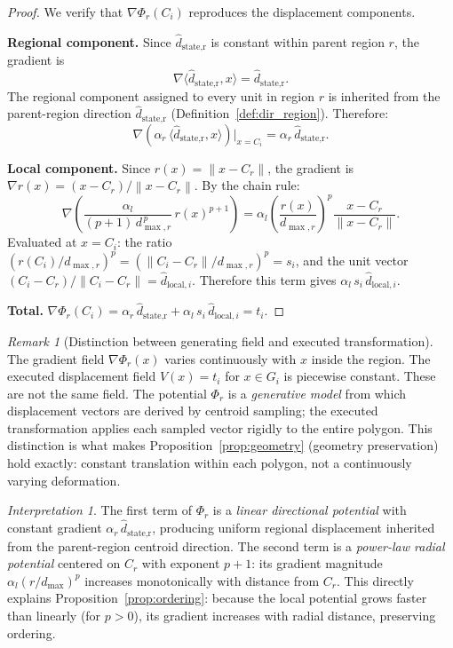 \documentclass[12pt, a4paper]{article}
\numberwithin{equation}{section}
\theoremstyle{definition}
\theoremstyle{plain}
\theoremstyle{remark}
\newtheorem*{remark}{Remark}
\newtheorem*{interpretation}{Interpretation}
\newcommand{\norm}[1]{\left\|#1\right\|}
\newcommand{\dhat}[1]{\hat{d}_{\text{#1}}}
\newcommand{\dhati}[1]{\hat{d}_{\text{#1},i}}
\newcommand{\inner}[2]{\langle #1, #2 \rangle}
\begin{document}
\begin{proof}
We verify that $\nabla\Phi_r(C_i)$ reproduces the displacement components.

\medskip\noindent\textbf{Regional component.}
Since $\dhat{state,r}$ is constant within parent region $r$, the gradient is
\[
  \nabla \inner{\dhat{state,r}}{x} = \dhat{state,r}.
\]
The regional component assigned to every unit in region $r$ is inherited from the parent-region direction $\dhat{state,r}$ (Definition~\ref{def:dir_region}). Therefore:
\[
  \nabla\!\left(\alpha_r\,\inner{\dhat{state,r}}{x}\right)\big|_{x = C_i} = \alpha_r\,\dhat{state,r}.
\]

\medskip\noindent\textbf{Local component.}
Since $r(x) = \norm{x - C_r}$, the gradient is $\nabla r(x) = (x - C_r)/\norm{x - C_r}$. By the chain rule:
\[
  \nabla\!\left(\frac{\alpha_l}{(p+1)\,d_{\max,r}^{\,p}}\,r(x)^{p+1}\right)
  = \alpha_l\left(\frac{r(x)}{d_{\max,r}}\right)^{\!p}\frac{x - C_r}{\norm{x - C_r}}.
\]
Evaluated at $x = C_i$: the ratio $(r(C_i)/d_{\max,r})^p = (\norm{C_i - C_r}/d_{\max,r})^p = s_i$, and the unit vector $(C_i - C_r)/\norm{C_i - C_r} = \dhati{local}$. Therefore this term gives $\alpha_l\,s_i\,\dhati{local}$.

\medskip\noindent\textbf{Total.}
$\nabla\Phi_r(C_i) = \alpha_r\,\dhat{state,r} + \alpha_l\,s_i\,\dhati{local} = t_i$.
\end{proof}

\begin{remark}[Distinction between generating field and executed transformation]
The gradient field $\nabla\Phi_r(x)$ varies continuously with $x$ inside the region. The executed displacement field $V(x) = t_i$ for $x \in G_i$ is piecewise constant. These are not the same field. The potential $\Phi_r$ is a \emph{generative model} from which displacement vectors are derived by centroid sampling; the executed transformation applies each sampled vector rigidly to the entire polygon. This distinction is what makes Proposition~\ref{prop:geometry} (geometry preservation) hold exactly: constant translation within each polygon, not a continuously varying deformation.
\end{remark}

\begin{interpretation}
The first term of $\Phi_r$ is a \emph{linear directional potential} with constant gradient $\alpha_r\,\dhat{state,r}$, producing uniform regional displacement inherited from the parent-region centroid direction. The second term is a \emph{power-law radial potential} centered on $C_r$ with exponent $p + 1$: its gradient magnitude $\alpha_l(r/d_{\max})^p$ increases monotonically with distance from $C_r$. This directly explains Proposition~\ref{prop:ordering}: because the local potential grows faster than linearly (for $p > 0$), its gradient increases with radial distance, preserving ordering.
\end{interpretation}
\end{document}
